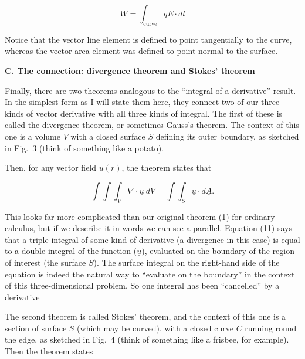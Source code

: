   \begin{equation*}W=\int_\mathrm{curve}{q\underline{E} \cdot d\underline{l}} 
  \tag{10}\end{equation*} 

  Notice that the vector line element is defined to point tangentially to the 
  curve, whereas the vector area element was defined to point normal to the 
  surface. 

  \textbf{C. The connection: divergence theorem and Stokes' theorem} 

  Finally, there are two theorems analogous to the ``integral of a derivative'' 
  result. In the simplest form as I will state them here, they connect two of 
  our three kinds of vector derivative with all three kinds of integral. The 
  first of these is called the divergence theorem, or sometimes Gauss's 
  theorem. The context of this one is a volume $V$ with a closed surface $S$ 
  defining its outer boundary, as sketched in Fig.\ 3 (think of something like 
  a potato). 


  Then, for any vector field $\underline{u}(\underline{r})$, the theorem states 
  that 

  \begin{equation*}\int{\int{\int_V{\nabla \cdot \underline{u} \mathrm{~} 
  dV}}}=\int{\int_S{\underline{u} \cdot d\underline{A}}} . 
  \tag{11}\end{equation*} 

  This looks far more complicated than our original theorem (1) for ordinary 
  calculus, but if we describe it in words we can see a parallel. Equation (11) 
  says that a triple integral of some kind of derivative (a divergence in this 
  case) is equal to a double integral of the function ($\underline{u}$), 
  evaluated on the boundary of the region of interest (the surface $S$). The 
  surface integral on the right-hand side of the equation is indeed the natural 
  way to ``evaluate on the boundary'' in the context of this three-dimensional 
  problem. So one integral has been ``cancelled'' by a derivative 

  The second theorem is called Stokes' theorem, and the context of this one is 
  a section of surface $S$ (which may be curved), with a closed curve $C$ 
  running round the edge, as sketched in Fig.\ 4 (think of something like a 
  frisbee, for example). Then the theorem states 


